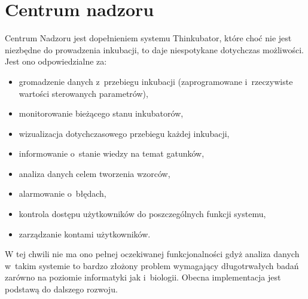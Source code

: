 \section{Centrum nadzoru}
Centrum Nadzoru jest dopełnieniem systemu Thinkubator, które choć nie jest niezbędne
do prowadzenia inkubacji, to daje niespotykane dotychczas możliwości. Jest ono odpowiedzialne za:
\begin{itemize}
	\item gromadzenie danych z~przebiegu inkubacji (zaprogramowane i~rzeczywiste wartości sterowanych parametrów),
	\item monitorowanie bieżącego stanu inkubatorów,
	\item wizualizacja dotychczasowego przebiegu każdej inkubacji,
	\item informowanie o~stanie wiedzy na temat gatunków,
	\item analiza danych celem tworzenia wzorców,
	\item alarmowanie o~błędach,
	\item kontrola dostępu użytkowników do poszczególnych funkcji systemu,
	\item zarządzanie kontami użytkowników.
\end{itemize}
W tej chwili nie ma ono pełnej oczekiwanej funkcjonalności gdyż analiza danych w~takim systemie to bardzo złożony problem wymagający długotrwałych badań zarówno na poziomie informatyki jak i~biologii. Obecna implementacja jest podstawą do dalszego rozwoju.

